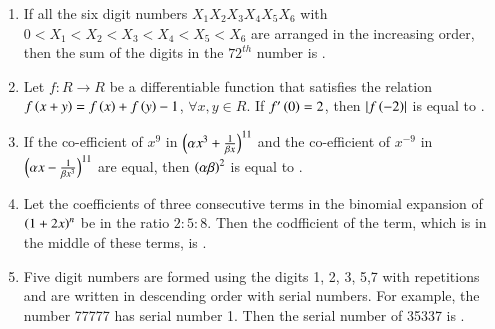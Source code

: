 \documentclass[journal]{IEEEtran}
\begin{document}
\begin{enumerate}[start=16]
\item If all the six digit numbers $X_{1}X_{2}X_{3}X_{4}X_{5}X_{6}$ with $0<X_{1}<X_{2}<X_{3}<X_{4}<X_{5}<X_{6}$ are arranged in the increasing order, then the sum of the digits in the $72^{th}$ number is \underline{\hspace{2.5cm}}.\\
\item Let $f\colon R \to R$ be a differentiable function that satisfies the relation $f\left(x+y\right)=f\left(x\right)+f\left(y\right)-1$, $\forall{x},y\in R$. If $f^{\prime}\left(0\right)=2$, then $\lvert f\left(-2\right)\rvert$ is equal to \underline{\hspace{2.5cm}}.\\
\item If the co-efficient of $x^{9}$ in $\left(\alpha x^{3}+\frac{1}{\beta x}\right)^{11}$ and the co-efficient of $x^{-9}$ in $\left(\alpha x-\frac{1}{\beta x^{3}}\right)^{11}$ are equal, then $\left(\alpha\beta\right)^{2}$ is equal to \underline{\hspace{2.5cm}}.\\
\item Let the coefficients of three consecutive terms in the binomial expansion of $\left(1+2x\right)^{n}$ be in the ratio $2\colon5\colon8$. Then the codfficient of the term, which  is in the middle of these terms, is \underline{\hspace{2.5cm}}.\\
\item Five digit numbers are formed using the digits 1, 2, 3, 5,7 with repetitions and are written in descending order with serial numbers. For example, the number 77777 has serial number 1. Then the serial number of 35337 is \underline{\hspace{2.5cm}}.\\



























\end{enumerate}
\end{document}
